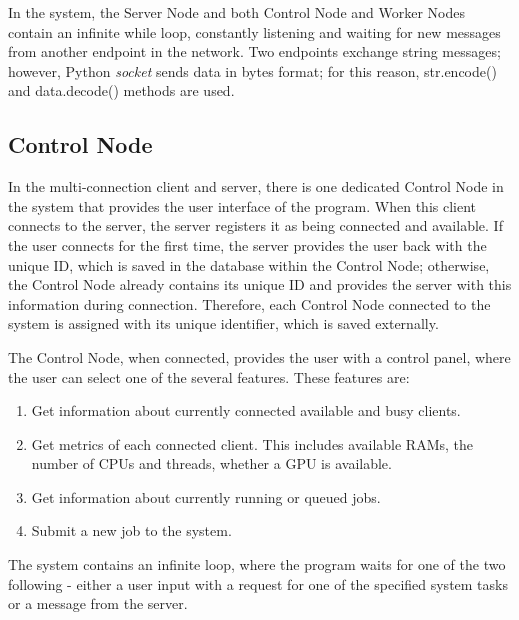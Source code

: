 \documentclass[10pt]{report}
\begin{document}
In the system, the Server Node and both Control Node and Worker Nodes contain an infinite while loop, constantly listening and waiting for new messages from another endpoint in the network. Two endpoints exchange string messages; however, Python \textit{socket} sends data in bytes format; for this reason, str.encode() and data.decode() methods are used.

\subsection{Control Node} \label{controlnode}

In the multi-connection client and server, there is one dedicated Control Node in the system that provides the user interface of the program. When this client connects to the server, the server registers it as being connected and available. If the user connects for the first time, the server provides the user back with the unique ID, which is saved in the database within the Control Node; otherwise, the Control Node already contains its unique ID and provides the server with this information during connection. Therefore, each Control Node connected to the system is assigned with its unique identifier, which is saved externally.
\newline

The Control Node, when connected, provides the user with a control panel, where the user can select one of the several features. These features are:
\begin{enumerate}
    \item Get information about currently connected available and busy clients.
    \item Get metrics of each connected client. This includes available RAMs, the number of CPUs and threads, whether a GPU is available.
    \item Get information about currently running or queued jobs.
    \item Submit a new job to the system.
\end{enumerate}

The system contains an infinite loop, where the program waits for one of the two following - either a user input with a request for one of the specified system tasks or a message from the server.
\end{document}

